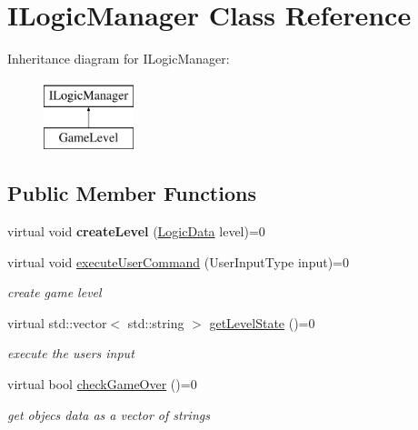 \hypertarget{class_i_logic_manager}{}\section{I\+Logic\+Manager Class Reference}
\label{class_i_logic_manager}
Inheritance diagram for I\+Logic\+Manager\+:\begin{figure}[H]
\begin{center}
\leavevmode
\includegraphics[height=2.000000cm]{class_i_logic_manager}
\end{center}
\end{figure}
\subsection*{Public Member Functions}
\begin{DoxyCompactItemize}
\item 
\mbox{\label{class_i_logic_manager_a7c3df41254653f3556353dff3a04b48c}} 
virtual void {\bfseries create\+Level} (\mbox{\hyperlink{class_logic_data}{Logic\+Data}} level)=0
\item 
\mbox{\label{class_i_logic_manager_a531478a93285f5cdf6f22294638b27b3}} 
virtual void \mbox{\hyperlink{class_i_logic_manager_a531478a93285f5cdf6f22294638b27b3}{execute\+User\+Command}} (User\+Input\+Type input)=0
\begin{DoxyCompactList}\small\item\em create game level \end{DoxyCompactList}\item 
\mbox{\label{class_i_logic_manager_a84c0a5dd05e195dc99a2c35880f7bfb9}} 
virtual std\+::vector$<$ std\+::string $>$ \mbox{\hyperlink{class_i_logic_manager_a84c0a5dd05e195dc99a2c35880f7bfb9}{get\+Level\+State}} ()=0
\begin{DoxyCompactList}\small\item\em execute the users input \end{DoxyCompactList}\item 
\mbox{\label{class_i_logic_manager_a4b756d111ec45b7d92ee0da4a5612a40}} 
virtual bool \mbox{\hyperlink{class_i_logic_manager_a4b756d111ec45b7d92ee0da4a5612a40}{check\+Game\+Over}} ()=0
\begin{DoxyCompactList}\small\item\em get objec\textquotesingle{}s data as a vector of strings \end{DoxyCompactList}\end{DoxyCompactItemize}


